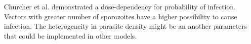 \documentclass[a4paper, 12pt, twoside]{article}
\begin{document}
Churcher et al.\cite{Churcher2017a} demonstrated a dose-dependency for probability of infection.
Vectors with greater number of sporozoites have a higher possibility to cause infection.
The heterogeneity in parasite density might be an another parameters that could be implemented in other models.

%
%
%
%
%
%
%
%
%
%
%
%
%
\end{document}
